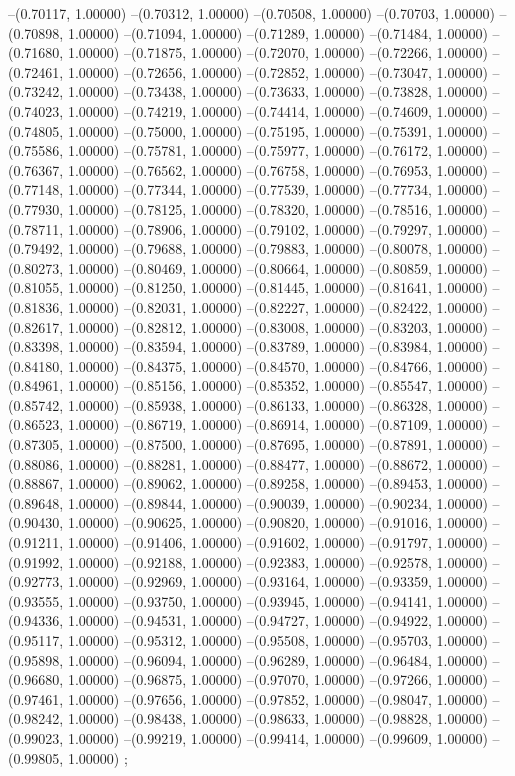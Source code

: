 --(0.70117, 1.00000)
--(0.70312, 1.00000)
--(0.70508, 1.00000)
--(0.70703, 1.00000)
--(0.70898, 1.00000)
--(0.71094, 1.00000)
--(0.71289, 1.00000)
--(0.71484, 1.00000)
--(0.71680, 1.00000)
--(0.71875, 1.00000)
--(0.72070, 1.00000)
--(0.72266, 1.00000)
--(0.72461, 1.00000)
--(0.72656, 1.00000)
--(0.72852, 1.00000)
--(0.73047, 1.00000)
--(0.73242, 1.00000)
--(0.73438, 1.00000)
--(0.73633, 1.00000)
--(0.73828, 1.00000)
--(0.74023, 1.00000)
--(0.74219, 1.00000)
--(0.74414, 1.00000)
--(0.74609, 1.00000)
--(0.74805, 1.00000)
--(0.75000, 1.00000)
--(0.75195, 1.00000)
--(0.75391, 1.00000)
--(0.75586, 1.00000)
--(0.75781, 1.00000)
--(0.75977, 1.00000)
--(0.76172, 1.00000)
--(0.76367, 1.00000)
--(0.76562, 1.00000)
--(0.76758, 1.00000)
--(0.76953, 1.00000)
--(0.77148, 1.00000)
--(0.77344, 1.00000)
--(0.77539, 1.00000)
--(0.77734, 1.00000)
--(0.77930, 1.00000)
--(0.78125, 1.00000)
--(0.78320, 1.00000)
--(0.78516, 1.00000)
--(0.78711, 1.00000)
--(0.78906, 1.00000)
--(0.79102, 1.00000)
--(0.79297, 1.00000)
--(0.79492, 1.00000)
--(0.79688, 1.00000)
--(0.79883, 1.00000)
--(0.80078, 1.00000)
--(0.80273, 1.00000)
--(0.80469, 1.00000)
--(0.80664, 1.00000)
--(0.80859, 1.00000)
--(0.81055, 1.00000)
--(0.81250, 1.00000)
--(0.81445, 1.00000)
--(0.81641, 1.00000)
--(0.81836, 1.00000)
--(0.82031, 1.00000)
--(0.82227, 1.00000)
--(0.82422, 1.00000)
--(0.82617, 1.00000)
--(0.82812, 1.00000)
--(0.83008, 1.00000)
--(0.83203, 1.00000)
--(0.83398, 1.00000)
--(0.83594, 1.00000)
--(0.83789, 1.00000)
--(0.83984, 1.00000)
--(0.84180, 1.00000)
--(0.84375, 1.00000)
--(0.84570, 1.00000)
--(0.84766, 1.00000)
--(0.84961, 1.00000)
--(0.85156, 1.00000)
--(0.85352, 1.00000)
--(0.85547, 1.00000)
--(0.85742, 1.00000)
--(0.85938, 1.00000)
--(0.86133, 1.00000)
--(0.86328, 1.00000)
--(0.86523, 1.00000)
--(0.86719, 1.00000)
--(0.86914, 1.00000)
--(0.87109, 1.00000)
--(0.87305, 1.00000)
--(0.87500, 1.00000)
--(0.87695, 1.00000)
--(0.87891, 1.00000)
--(0.88086, 1.00000)
--(0.88281, 1.00000)
--(0.88477, 1.00000)
--(0.88672, 1.00000)
--(0.88867, 1.00000)
--(0.89062, 1.00000)
--(0.89258, 1.00000)
--(0.89453, 1.00000)
--(0.89648, 1.00000)
--(0.89844, 1.00000)
--(0.90039, 1.00000)
--(0.90234, 1.00000)
--(0.90430, 1.00000)
--(0.90625, 1.00000)
--(0.90820, 1.00000)
--(0.91016, 1.00000)
--(0.91211, 1.00000)
--(0.91406, 1.00000)
--(0.91602, 1.00000)
--(0.91797, 1.00000)
--(0.91992, 1.00000)
--(0.92188, 1.00000)
--(0.92383, 1.00000)
--(0.92578, 1.00000)
--(0.92773, 1.00000)
--(0.92969, 1.00000)
--(0.93164, 1.00000)
--(0.93359, 1.00000)
--(0.93555, 1.00000)
--(0.93750, 1.00000)
--(0.93945, 1.00000)
--(0.94141, 1.00000)
--(0.94336, 1.00000)
--(0.94531, 1.00000)
--(0.94727, 1.00000)
--(0.94922, 1.00000)
--(0.95117, 1.00000)
--(0.95312, 1.00000)
--(0.95508, 1.00000)
--(0.95703, 1.00000)
--(0.95898, 1.00000)
--(0.96094, 1.00000)
--(0.96289, 1.00000)
--(0.96484, 1.00000)
--(0.96680, 1.00000)
--(0.96875, 1.00000)
--(0.97070, 1.00000)
--(0.97266, 1.00000)
--(0.97461, 1.00000)
--(0.97656, 1.00000)
--(0.97852, 1.00000)
--(0.98047, 1.00000)
--(0.98242, 1.00000)
--(0.98438, 1.00000)
--(0.98633, 1.00000)
--(0.98828, 1.00000)
--(0.99023, 1.00000)
--(0.99219, 1.00000)
--(0.99414, 1.00000)
--(0.99609, 1.00000)
--(0.99805, 1.00000)
;
